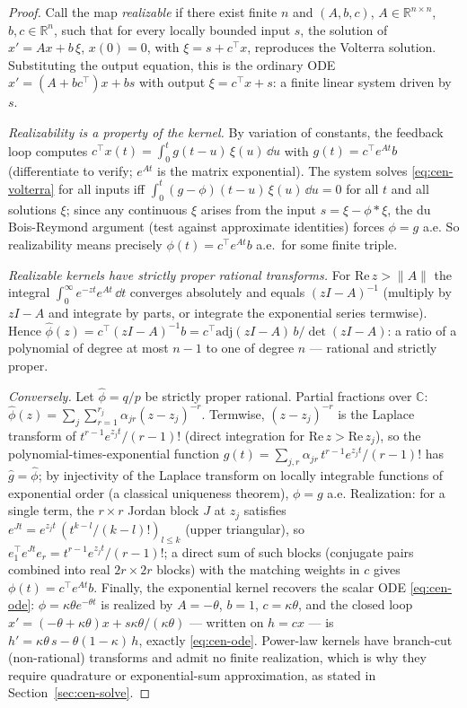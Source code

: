 \begin{proof}
Call the map \emph{realizable} if there exist finite $n$ and $(A, b, c)$, $A \in \mathbb{R}^{n
\times n}$, $b, c \in \mathbb{R}^n$, such that for every locally bounded input $s$, the solution of
$x' = A x + b\, \xi$, $x(0) = 0$, with $\xi = s + c^\top x$, reproduces the Volterra solution.
Substituting the output equation, this is the ordinary ODE $x' = (A + b c^\top) x + b s$ with output
$\xi = c^\top x + s$: a finite linear system driven by $s$.

\emph{Realizability is a property of the kernel.} By variation of constants, the feedback loop
computes $c^\top x(t) = \int_0^t g(t-u)\, \xi(u)\, \dd u$ with $g(t) = c^\top e^{At} b$
(differentiate to verify; $e^{At}$ is the matrix exponential). The system solves
\eqref{eq:cen-volterra} for all inputs iff $\int_0^t (g - \phi)(t - u)\, \xi(u)\, \dd u = 0$ for all
$t$ and all solutions $\xi$; since any continuous $\xi$ arises from the input $s = \xi - \phi *
\xi$, the du Bois-Reymond argument (test against approximate identities) forces $\phi = g$ a.e. So
realizability means precisely $\phi(t) = c^\top e^{At} b$ a.e.\ for some finite triple.

\emph{Realizable kernels have strictly proper rational transforms.} For $\mathrm{Re}\, z > \|A\|$
the integral $\int_0^\infty e^{-zt} e^{At}\, \dd t$ converges absolutely and equals $(zI - A)^{-1}$
(multiply by $zI - A$ and integrate by parts, or integrate the exponential series termwise). Hence
$\hat\phi(z) = c^\top (zI - A)^{-1} b = c^\top \mathrm{adj}(zI - A)\, b / \det(zI - A)$: a ratio of
a polynomial of degree at most $n - 1$ to one of degree $n$ --- rational and strictly proper.

\emph{Conversely.} Let $\hat\phi = q/p$ be strictly proper rational. Partial fractions over
$\mathbb{C}$: $\hat\phi(z) = \sum_j \sum_{r=1}^{r_j} \alpha_{jr} (z - z_j)^{-r}$. Termwise, $(z -
z_j)^{-r}$ is the Laplace transform of $t^{r-1} e^{z_j t}/(r-1)!$ (direct integration for
$\mathrm{Re}\, z > \mathrm{Re}\, z_j$), so the polynomial-times-exponential function $g(t) =
\sum_{j,r} \alpha_{jr}\, t^{r-1} e^{z_j t}/(r-1)!$ has $\hat g = \hat\phi$; by injectivity of the
Laplace transform on locally integrable functions of exponential order (a classical uniqueness
theorem), $\phi = g$ a.e. Realization: for a single term, the $r \times r$ Jordan block $J$ at $z_j$
satisfies $e^{Jt} = e^{z_j t}\,(t^{k-l}/(k-l)!)_{l \le k}$ (upper triangular), so $e_1^\top e^{Jt}
e_r = t^{r-1} e^{z_j t}/(r-1)!$; a direct sum of such blocks (conjugate pairs combined into real $2r
\times 2r$ blocks) with the matching weights in $c$ gives $\phi(t) = c^\top e^{At} b$. Finally, the
exponential kernel recovers the scalar ODE \eqref{eq:cen-ode}: $\phi = \kappa\theta e^{-\theta t}$
is realized by $A = -\theta$, $b = 1$, $c = \kappa\theta$, and the closed loop $x' = (-\theta +
\kappa\theta) x + s\kappa\theta/( \kappa\theta)$ --- written on $h = c x$ --- is $h' =
\kappa\theta\, s - \theta(1-\kappa)\, h$, exactly \eqref{eq:cen-ode}. Power-law kernels have
branch-cut (non-rational) transforms and admit no finite realization, which is why they require
quadrature or exponential-sum approximation, as stated in Section~\ref{sec:cen-solve}.
\end{proof}

